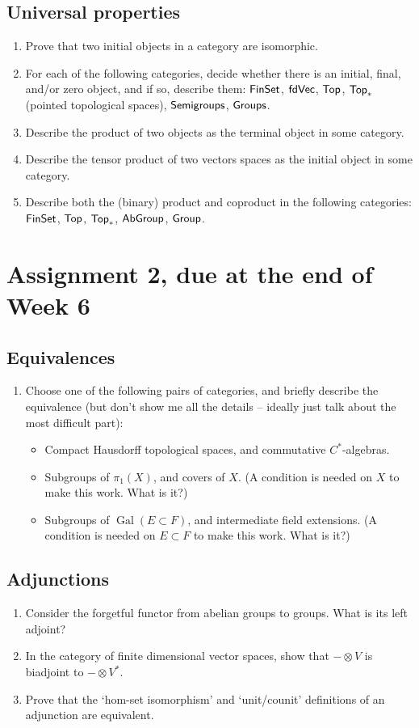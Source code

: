 \documentclass[12pt]{amsart}
\begin{document}
\subsection{Universal properties}
\begin{enumerate}
\item Prove that two initial objects in a category are isomorphic.
\item For each of the following categories, decide whether there is an initial, final, and/or zero object, and if so, describe them:
$\sf{FinSet}$, $\sf{fdVec}$, $\sf{Top}$, $\sf{Top}_*$ (pointed topological spaces), $\sf{Semigroups}$, $\sf{Groups}$.
\item Describe the product of two objects as the terminal object in some category.
\item Describe the tensor product of two vectors spaces as the initial object in some category.
\item Describe both the (binary) product and coproduct in the following categories: $\sf{FinSet}$, $\sf{Top}$, $\sf{Top}_*$, $\sf{AbGroup}$, $\sf{Group}$.
\end{enumerate}

\newpage
\section{Assignment 2, due at the end of Week 6}
\subsection{Equivalences}
\begin{enumerate}
\item Choose one of the following pairs of categories, and briefly describe the equivalence (but don't show me all the details -- ideally just talk about the most difficult part):
\begin{itemize}
	\item Compact Hausdorff topological spaces, and commutative $C^*$-algebras.
	\item Subgroups of $\pi_1(X)$, and covers of $X$. (A condition is needed on $X$ to make this work. What is it?)
	\item Subgroups of $\operatorname{Gal}(E \subset F)$, and intermediate field extensions. (A condition is needed on $E \subset F$ to make this work. What is it?)
\end{itemize}
\end{enumerate}

\subsection{Adjunctions}
\begin{enumerate}
\item Consider the forgetful functor from abelian groups to groups. What is its left adjoint?
\item In the category of finite dimensional vector spaces, show that $- \otimes V$ is biadjoint to $- \otimes V^*$.
\item Prove that the `hom-set isomorphism' and `unit/counit' definitions of an adjunction are equivalent.
\end{enumerate}
\end{document}
